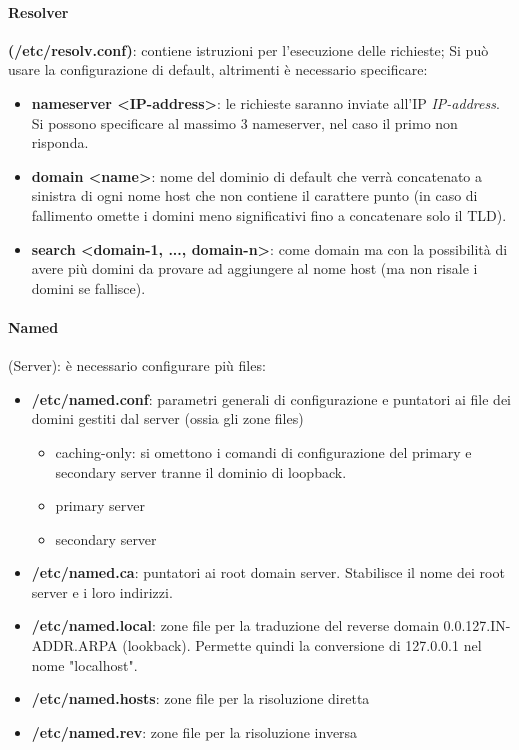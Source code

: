 \documentclass[a4paper,11pt]{article}
\begin{document}
\paragraph{Resolver} \textbf{(/etc/resolv.conf)}: contiene istruzioni per l'esecuzione delle richieste; Si può usare la configurazione di default, altrimenti è necessario specificare:
\begin{itemize}
\item \textbf{nameserver \textless IP-address\textgreater}: le richieste saranno inviate all'IP \textit{IP-address}. Si possono specificare al massimo 3 nameserver, nel caso il primo non risponda.
\item \textbf{domain \textless name\textgreater}: nome del dominio di default che verrà concatenato a sinistra di ogni nome host che non contiene il carattere punto (in caso di fallimento omette i domini meno significativi fino a concatenare solo il TLD).
\item \textbf{search \textless domain-1, ..., domain-n\textgreater}: come domain ma con la possibilità di avere più domini da provare ad aggiungere al nome host (ma non risale i domini se fallisce).
\end{itemize}

\paragraph{Named} (Server): è necessario configurare più files: 
\begin{itemize}
\item \textbf{/etc/named.conf}: parametri generali di configurazione e puntatori ai file dei domini gestiti dal server (ossia gli zone files)
\begin{itemize}
\item caching-only: si omettono i comandi di configurazione del primary e secondary server tranne il dominio di loopback.
\item primary server
\item secondary server
\end{itemize}
\item \textbf{/etc/named.ca}: puntatori ai root domain server. Stabilisce il nome dei root server e i loro indirizzi.
\item \textbf{/etc/named.local}: zone file per la traduzione del reverse domain 0.0.127.IN-ADDR.ARPA (lookback). Permette quindi la conversione di 127.0.0.1 nel nome "localhost".
\item \textbf{/etc/named.hosts}: zone file per la risoluzione diretta
\item \textbf{/etc/named.rev}: zone file per la risoluzione inversa
\end{itemize}
\end{document}
